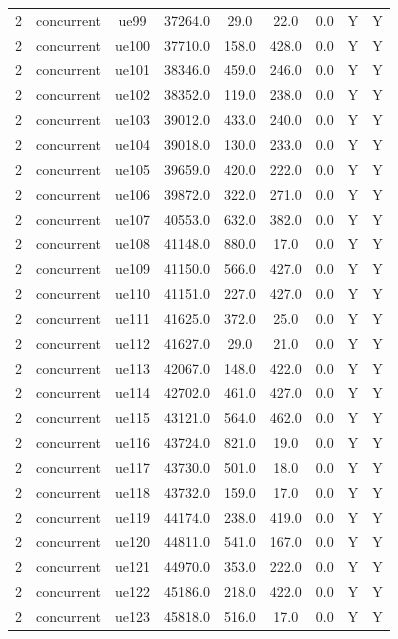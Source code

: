 \begin{table}[ht]
\begin{tabular}{|c|c|c|c|c|c|c|c|c|}
2 & concurrent & ue99 & 37264.0 & 29.0 & 22.0 & 0.0 & Y & Y \\
2 & concurrent & ue100 & 37710.0 & 158.0 & 428.0 & 0.0 & Y & Y \\
2 & concurrent & ue101 & 38346.0 & 459.0 & 246.0 & 0.0 & Y & Y \\
2 & concurrent & ue102 & 38352.0 & 119.0 & 238.0 & 0.0 & Y & Y \\
2 & concurrent & ue103 & 39012.0 & 433.0 & 240.0 & 0.0 & Y & Y \\
2 & concurrent & ue104 & 39018.0 & 130.0 & 233.0 & 0.0 & Y & Y \\
2 & concurrent & ue105 & 39659.0 & 420.0 & 222.0 & 0.0 & Y & Y \\
2 & concurrent & ue106 & 39872.0 & 322.0 & 271.0 & 0.0 & Y & Y \\
2 & concurrent & ue107 & 40553.0 & 632.0 & 382.0 & 0.0 & Y & Y \\
2 & concurrent & ue108 & 41148.0 & 880.0 & 17.0 & 0.0 & Y & Y \\
2 & concurrent & ue109 & 41150.0 & 566.0 & 427.0 & 0.0 & Y & Y \\
2 & concurrent & ue110 & 41151.0 & 227.0 & 427.0 & 0.0 & Y & Y \\
2 & concurrent & ue111 & 41625.0 & 372.0 & 25.0 & 0.0 & Y & Y \\
2 & concurrent & ue112 & 41627.0 & 29.0 & 21.0 & 0.0 & Y & Y \\
2 & concurrent & ue113 & 42067.0 & 148.0 & 422.0 & 0.0 & Y & Y \\
2 & concurrent & ue114 & 42702.0 & 461.0 & 427.0 & 0.0 & Y & Y \\
2 & concurrent & ue115 & 43121.0 & 564.0 & 462.0 & 0.0 & Y & Y \\
2 & concurrent & ue116 & 43724.0 & 821.0 & 19.0 & 0.0 & Y & Y \\
2 & concurrent & ue117 & 43730.0 & 501.0 & 18.0 & 0.0 & Y & Y \\
2 & concurrent & ue118 & 43732.0 & 159.0 & 17.0 & 0.0 & Y & Y \\
2 & concurrent & ue119 & 44174.0 & 238.0 & 419.0 & 0.0 & Y & Y \\
2 & concurrent & ue120 & 44811.0 & 541.0 & 167.0 & 0.0 & Y & Y \\
2 & concurrent & ue121 & 44970.0 & 353.0 & 222.0 & 0.0 & Y & Y \\
2 & concurrent & ue122 & 45186.0 & 218.0 & 422.0 & 0.0 & Y & Y \\
2 & concurrent & ue123 & 45818.0 & 516.0 & 17.0 & 0.0 & Y & Y \\

\end{tabular}
\end{table}

